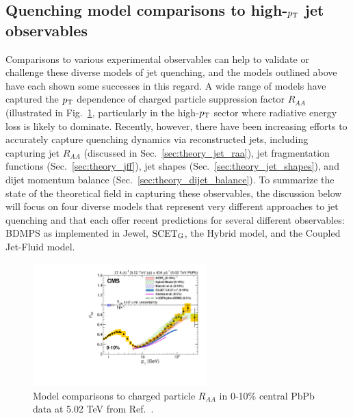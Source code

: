 \subsection{Quenching model comparisons to high-$p_{\rm T}$ jet observables}
\label{sec:model_comparison}

Comparisons to various experimental observables can help to validate or challenge these diverse models of jet quenching, and the models outlined above have each shown some successes in this regard.  A wide range of models have captured the $p_{\rm T}$ dependence of charged particle suppression factor $R_{AA}$ (illustrated in Fig.~\ref{fig:cms_chpart_raa_theory}, particularly in the high-$p_{\rm T}$ sector where radiative energy loss is likely to dominate.  Recently, however, there have been increasing efforts to accurately capture quenching dynamics via reconstructed jets, including capturing jet $R_{AA}$ (discussed in Sec.~\ref{sec:theory_jet_raa}), jet fragmentation functions (Sec.~\ref{sec:theory_jff}), jet shapes (Sec.~\ref{sec:theory_jet_shapes}), and dijet momentum balance (Sec.~\ref{sec:theory_dijet_balance}).  To summarize the state of the theoretical field in capturing these observables, the discussion below will focus on four diverse models that represent very different approaches to jet quenching and that each offer recent predictions for several different observables:  BDMPS as implemented in {\sc Jewel}, $\rm SCET_{G}$, the Hybrid model, and the Coupled Jet-Fluid model.  

\begin{figure}[hbtp]
\begin{center}
\includegraphics[width=0.6\textwidth]{figures/Theory/ChPart_Raa_CMS_Theory.pdf}
\caption[Model comparisons to charged particle $R_{AA}$ at 5.02 TeV]{Model comparisons to charged particle $R_{AA}$ in 0-10\% central PbPb data at 5.02 TeV from Ref.~\cite{Khachatryan:2016odn}.}
\label{fig:cms_chpart_raa_theory}
\end{center}
\end{figure}


